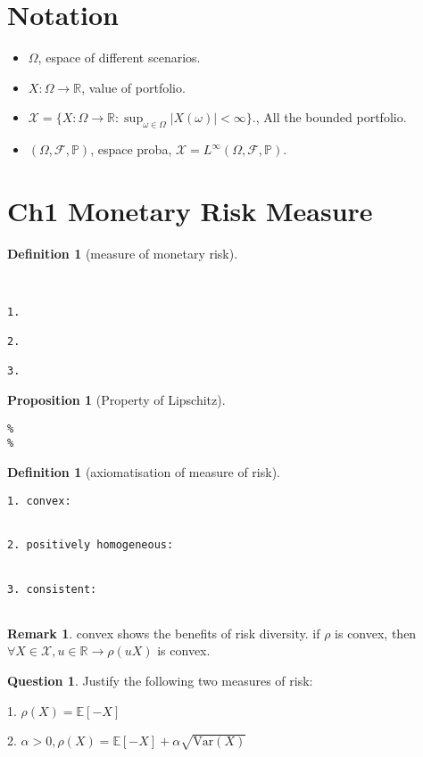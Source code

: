 \documentclass[letterpaper, 11pt]{article}
\let\mc\mathcal
\newcommand{\R}{\mathbb{R}}   %
\newcommand{\pr}{\mathbb{P}}    %
\newcommand{\E}{\mathbb{E}}     %
\newcommand{\var}{\text{Var}}   %
\newcommand{\1}{\mathds{1}}	%
\theoremstyle{definition}
\newtheorem{proposition}[theorem]{Proposition}
\newtheorem{definition}[theorem]{Definition}
\newtheorem{remark}[theorem]{Remark}
\newtheorem{question}[theorem]{Question}
\begin{document}
\section*{Notation}
\begin{itemize}
    \item $\Omega$, espace of different scenarios.
    \item $X:\Omega \rightarrow \R$, value of portfolio.
    \item $\mc{X}=\{X: \Omega \rightarrow \R: \sup_{\omega \in \Omega}|X(\omega)|<\infty \}.$, All the bounded portfolio.
    \item $(\Omega,\mc{F},\pr)$, espace proba, $\mc{X}=L^{\infty}(\Omega,\mc{F},\pr)$.
\end{itemize}


\section{Ch1 Monetary Risk Measure}
\begin{definition}[measure of monetary risk]
\end{definition}
\begin{lstlisting}


1.

2.

3.

\end{lstlisting}

\begin{proposition}[Property of Lipschitz]
\end{proposition}
\begin{lstlisting}
%
%
\end{lstlisting}

\begin{definition}[axiomatisation of measure of risk]
\end{definition}
\begin{lstlisting}
1. convex:


2. positively homogeneous:


3. consistent:


\end{lstlisting}

\begin{remark}
    convex shows the benefits of risk diversity.
    if $\rho$ is convex, then $\forall X \in \mc{X}, u \in \R \rightarrow \rho(uX)$ is convex.
\end{remark}

\begin{question}
Justify the following two measures of risk:

1. $\rho(X) = \E[-X]$

2. $\alpha > 0, \rho(X)=\E[-X]+\alpha \sqrt{\var(X)}$
\end{question}
\end{document}
